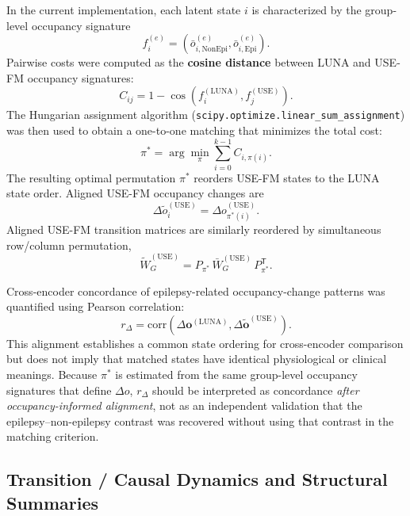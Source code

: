 In the current implementation, each latent state $i$ is characterized by the
group-level occupancy signature
\[
f_i^{(e)}
=
\left(
\bar{o}_{i,\mathrm{NonEpi}}^{(e)},
\bar{o}_{i,\mathrm{Epi}}^{(e)}
\right).
\]
Pairwise costs were computed as the \textbf{cosine distance} between LUNA and
USE-FM occupancy signatures:
\[
C_{ij}
=
1-\cos\!\left(
f_i^{(\mathrm{LUNA})},
f_j^{(\mathrm{USE})}
\right).
\]
The Hungarian assignment algorithm
(\texttt{scipy.optimize.linear\_sum\_assignment}) was then used to obtain a
one-to-one matching that minimizes the total cost:
\[
\pi^{*}
=
\arg\min_{\pi}
\sum_{i=0}^{k-1}
C_{i,\pi(i)}.
\]
The resulting optimal permutation $\pi^{*}$ reorders USE-FM states to the LUNA
state order. Aligned USE-FM occupancy changes are
\[
\Delta\tilde{o}_i^{(\mathrm{USE})}
=
\Delta o_{\pi^{*}(i)}^{(\mathrm{USE})}.
\]
Aligned USE-FM transition matrices are similarly reordered by simultaneous
row/column permutation,
\[
\tilde{W}_{G}^{(\mathrm{USE})}
=
P_{\pi^{*}}\,
\bar{W}_{G}^{(\mathrm{USE})}\,
P_{\pi^{*}}^{\mathsf{T}}.
\]

Cross-encoder concordance of epilepsy-related occupancy-change patterns was
quantified using Pearson correlation:
\[
r_{\Delta}
=
\mathrm{corr}
\left(
\Delta\mathbf{o}^{(\mathrm{LUNA})},
\Delta\tilde{\mathbf{o}}^{(\mathrm{USE})}
\right).
\]
This alignment establishes a common state ordering for cross-encoder comparison
but does not imply that matched states have identical physiological or clinical
meanings. Because $\pi^{*}$ is estimated from the same group-level occupancy
signatures that define $\Delta o$, $r_{\Delta}$ should be interpreted as
concordance \emph{after occupancy-informed alignment}, not as an independent
validation that the epilepsy--non-epilepsy contrast was recovered without using
that contrast in the matching criterion.


\subsection{Transition / Causal Dynamics and Structural Summaries}

